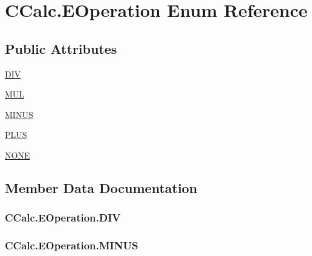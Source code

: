 \hypertarget{enum_c_calc_1_1_e_operation}{}\section{C\+Calc.\+E\+Operation Enum Reference}
\label{enum_c_calc_1_1_e_operation}
\subsection*{Public Attributes}
\begin{DoxyCompactItemize}
\item 
\hyperlink{enum_c_calc_1_1_e_operation_acb7e631b5cd8fe54a8d08f3a485ccb69}{D\+IV}
\item 
\hyperlink{enum_c_calc_1_1_e_operation_a051966564e9f03115fb805a1960aa836}{M\+UL}
\item 
\hyperlink{enum_c_calc_1_1_e_operation_a627587d07fe46d950425ee612af04337}{M\+I\+N\+US}
\item 
\hyperlink{enum_c_calc_1_1_e_operation_afc16350b26643685dff75544f58ca765}{P\+L\+US}
\item 
\hyperlink{enum_c_calc_1_1_e_operation_a9aab46d4e883fd9980cf6240d3b12420}{N\+O\+NE}
\end{DoxyCompactItemize}


\subsection{Member Data Documentation}
\subsubsection[{\texorpdfstring{D\+IV}{DIV}}]{\setlength{\rightskip}{0pt plus 5cm}C\+Calc.\+E\+Operation.\+D\+IV}\hypertarget{enum_c_calc_1_1_e_operation_acb7e631b5cd8fe54a8d08f3a485ccb69}{}\label{enum_c_calc_1_1_e_operation_acb7e631b5cd8fe54a8d08f3a485ccb69}
\subsubsection[{\texorpdfstring{M\+I\+N\+US}{MINUS}}]{\setlength{\rightskip}{0pt plus 5cm}C\+Calc.\+E\+Operation.\+M\+I\+N\+US}\hypertarget{enum_c_calc_1_1_e_operation_a627587d07fe46d950425ee612af04337}{}\label{enum_c_calc_1_1_e_operation_a627587d07fe46d950425ee612af04337}
